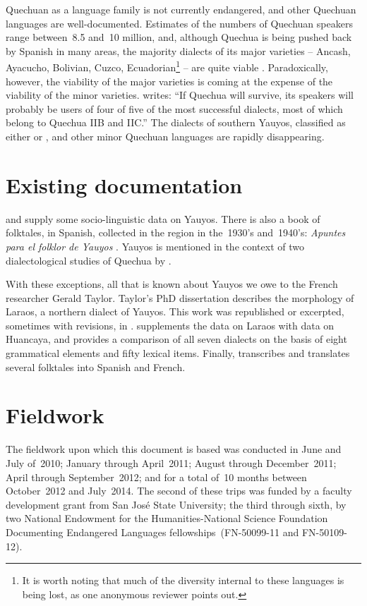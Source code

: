 Quechuan as a language family is not currently endangered, and other Quechuan languages are well-documented. Estimates of the numbers of Quechuan speakers range between~8.5 and~10 million, and, although Quechua is being pushed back by Spanish in many areas, the majority dialects of its major varieties -- Ancash, Ayacucho, Bolivian, Cuzco, Ecuadorian\footnote{It is worth noting that much of the diversity internal to these languages is being lost, as one anonymous reviewer points out.} -- are quite viable \citep[168]{Adelaar04}. Paradoxically, however, the viability of the major varieties is coming at the expense of the viability of the minor varieties. \citet[14]{Adelaar08} writes: ``If Quechua will survive, its speakers will probably be users of four of five of the most successful dialects, most of which belong to Quechua IIB and IIC.'' The dialects of southern Yauyos, classified as either \QI{} or \QIIA, and other minor Quechuan languages are rapidly disappearing.

\section{Existing documentation } \label{sec:documentation}
\citet{Echerd74} and \citet{Brougere92} supply some socio-linguistic data on Yauyos. There is also a book of folktales, in Spanish, collected in the region in the~1930's and~1940's: \emph{Apuntes para el folklor de Yauyos} \citep{Varilla}. Yauyos is mentioned in the context of two dialectological studies of Quechua by \citet{Torero68,Torero74}.

With these exceptions, all that is known about Yauyos we owe to the French researcher Gerald Taylor. Taylor's PhD dissertation describes the morphology of Laraos, a northern dialect of Yauyos. This work was republished or excerpted, sometimes with revisions, in \citet{Taylor84,Taylor90,Taylor94a,Taylor94b}. \citet{Taylor87a} supplements the data on Laraos with data on Huancaya, and
\citet{Taylor90,Taylor00} provides a comparison of all seven dialects on the basis of eight grammatical elements and fifty lexical items. Finally, \citet{Taylor87b,Taylor87c,Taylor91} transcribes and translates several folktales into Spanish and French.

\section{Fieldwork} \label{sec:fieldwork}
The fieldwork upon which this document is based was conducted in June and July of~2010; January through April~2011; August through December~2011; April through September~2012; and for a total of~10 months between October~2012 and July~2014. The second of these trips was funded by a faculty development grant from San Jos\'e State University; the third through sixth, by two National Endowment for the Humanities-National Science Foundation Documenting Endangered Languages fellowships~(FN-50099-11 and FN-50109-12).

